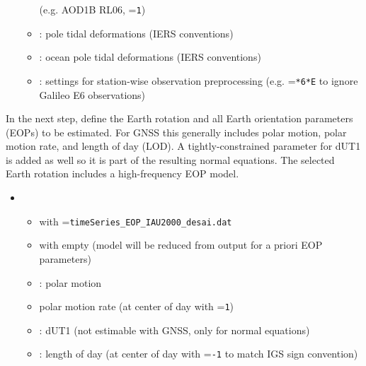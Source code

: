 \begin{itemize}
\begin{itemize}
          (e.g. AOD1B RL06, =\verb|1|)
    \item {}: pole tidal deformations (IERS conventions)
    \item {}: ocean pole tidal deformations (IERS conventions)
    \item {}: settings for station-wise observation preprocessing
          (e.g. =\verb|*6*E| to ignore Galileo E6 observations)
  \end{itemize}
\end{itemize}

In the next step, define the Earth rotation and all Earth orientation parameters (EOPs) to be estimated. For GNSS this
generally includes polar motion, polar motion rate, and length of day (LOD). A tightly-constrained parameter for dUT1
is added as well so it is part of the resulting normal equations. The selected Earth rotation includes a high-frequency
EOP model.
\begin{itemize}
  \item {}
  \begin{itemize}
    \item {}
          with =\verb|timeSeries_EOP_IAU2000_desai.dat|
    \item {} with empty
           (model will be reduced from output for a priori EOP parameters)
    \item {}: polar motion
    \item {} polar motion rate
          (at center of day with =\verb|1|)
    \item {}:
          dUT1 (not estimable with GNSS, only for normal equations)
    \item {}: length of day (at center of day with
          =\verb|-1| to match IGS sign convention)
  \end{itemize}
\end{itemize}

